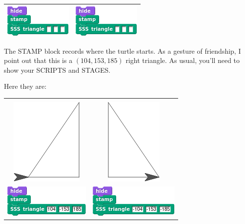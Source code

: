 \documentclass[noauthor,nooutcomes,12pt,hints,handout]{ximera}
\begin{document}
\begin{question}
\begin{center}
\begin{tabular}{|c||c|}
      \includegraphics{SSSstampBlank.png} & \includegraphics{SSSstampBlank.png} \\\hline
    \end{tabular}
  \end{center}
  The STAMP block records where the turtle starts. As a gesture of
  friendship, I point out that this is a $(104, 153, 185)$ right
  triangle. As usual, you'll need to show your SCRIPTS and STAGES.
  \begin{freeResponse}
    Here they are:
    \begin{center}
    \begin{tabular}{|c||c|}\hline
      &  \\
      \includegraphics{stampStageII.png} & \includegraphics{stampStageI.png} \\
      \includegraphics{SSSstampScriptII.png} & \includegraphics{SSSstampScriptI.png} \\

\end{tabular}
\end{center}
\end{freeResponse}
\end{question}
\end{document}
